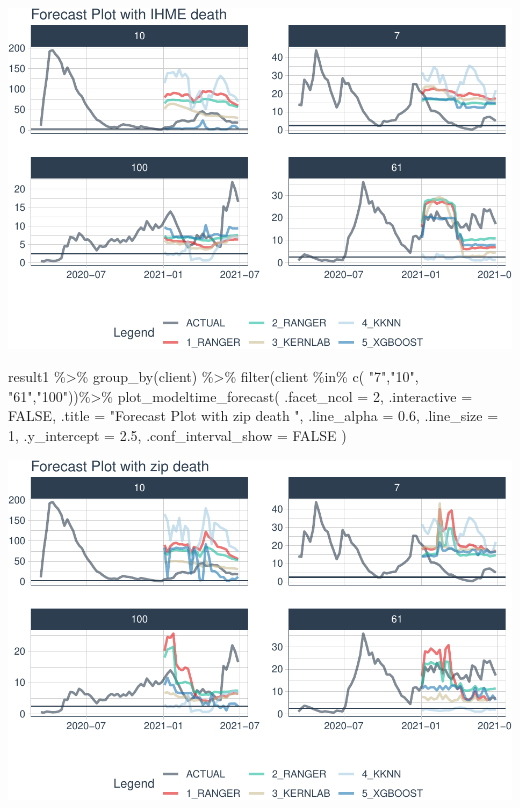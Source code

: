 \documentclass[
]{article}
\newenvironment{Shaded}{\begin{snugshade}}{\end{snugshade}}
\newcommand{\AttributeTok}[1]{\textcolor[rgb]{0.77,0.63,0.00}{#1}}
\newcommand{\ConstantTok}[1]{\textcolor[rgb]{0.00,0.00,0.00}{#1}}
\newcommand{\DecValTok}[1]{\textcolor[rgb]{0.00,0.00,0.81}{#1}}
\newcommand{\FloatTok}[1]{\textcolor[rgb]{0.00,0.00,0.81}{#1}}
\newcommand{\FunctionTok}[1]{\textcolor[rgb]{0.00,0.00,0.00}{#1}}
\newcommand{\NormalTok}[1]{#1}
\newcommand{\SpecialCharTok}[1]{\textcolor[rgb]{0.00,0.00,0.00}{#1}}
\newcommand{\StringTok}[1]{\textcolor[rgb]{0.31,0.60,0.02}{#1}}
\begin{document}
\includegraphics{figures/report/fig-unnamed-chunk-80-1.pdf}

\begin{Shaded}
\begin{Highlighting}[]
\NormalTok{result1 }\SpecialCharTok{\%\textgreater{}\%}
    \FunctionTok{group\_by}\NormalTok{(client) }\SpecialCharTok{\%\textgreater{}\%}
    \FunctionTok{filter}\NormalTok{(client }\SpecialCharTok{\%in\%} \FunctionTok{c}\NormalTok{(  }\StringTok{"7"}\NormalTok{,}\StringTok{"10"}\NormalTok{, }\StringTok{"61"}\NormalTok{,}\StringTok{"100"}\NormalTok{))}\SpecialCharTok{\%\textgreater{}\%}
    \FunctionTok{plot\_modeltime\_forecast}\NormalTok{(}
        \AttributeTok{.facet\_ncol  =} \DecValTok{2}\NormalTok{,}
        \AttributeTok{.interactive =} \ConstantTok{FALSE}\NormalTok{,}
        \AttributeTok{.title =} \StringTok{"Forecast Plot with zip death "}\NormalTok{,}
        \AttributeTok{.line\_alpha =} \FloatTok{0.6}\NormalTok{,}
        \AttributeTok{.line\_size =} \DecValTok{1}\NormalTok{,}
        \AttributeTok{.y\_intercept =} \FloatTok{2.5}\NormalTok{,}
        \AttributeTok{.conf\_interval\_show =} \ConstantTok{FALSE}
\NormalTok{    )}
\end{Highlighting}
\end{Shaded}

\includegraphics{figures/report/fig-unnamed-chunk-80-2.pdf}
\end{document}
